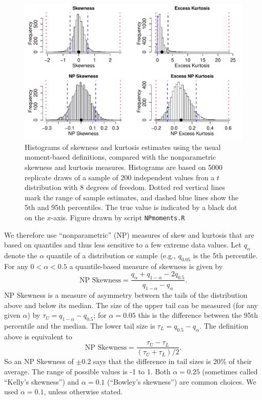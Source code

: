 \documentclass[11pt]{article}
\newcounter{box}
\newcommand{\be}{\begin{equation}}
\newcommand{\ee}{\end{equation}}
\begin{document}
{\begin{figure}[tbp]
\centering
\includegraphics[width=\textwidth]{figures/NPmoments.pdf}
\caption{Histograms of skewness and kurtosis estimates using the usual moment-based definitions, compared with the nonparametric
skewness and kurtosis measures. Histograms are based on 5000 replicate draws of a sample of 200 independent values fron 
a $t$ distribution with 8 degrees of freedom. Dotted red vertical lines mark the range of sample estimates, 
and dashed blue lines show the 5th and 95th percentiles. The true value is indicated by a black dot on the $x$-axis.
Figure drawn by script \texttt{NPmoments.R}}
\label{fig:NPmoments}
\end{figure} 

We therefore use ``nonparametric'' (NP) measures of skew and kurtosis that are based on quantiles and thus  
less sensitive to a few extreme data values. Let $q_\alpha$ denote the $\alpha$ quantile of a distribution or sample (e.g., $q_{0.05}$ 
is the 5th percentile. For any $0 < \alpha < 0.5$ a quantile-based measure of skewness is given by \citep{mcgillivray-1986}
\be
\mbox{NP Skewness} = \frac{q_\alpha + q_{1-\alpha} - 2 q_{0.5}}{q_{1-\alpha} - q_\alpha}.
\ee
NP Skewness is a measure of asymmetry between the tails of the distribution above and below its median. The size of the upper
tail can be measured (for any given $\alpha$) by $\tau_U = q_{1-\alpha} - q_{0.5}$; for $\alpha=0.05$ this is the difference
between the 95th percentile and the median. The lower tail size is $\tau_L = q_{0.5} - q_\alpha$. The definition above
is equivalent to  
\be
\mbox{NP Skewness} = \frac{\tau_U - \tau_L}{(\tau_U + \tau_L)/2}.
\label{eqn:NPskew}
\ee
So an NP Skewness of $\pm 0.2$ says that the difference in tail sizes is 20\% of their average. The range of possible values 
is -1 to 1. Both $\alpha=0.25$ (sometimes called ``Kelly's skewness'') and $\alpha=0.1$ (``Bowley's skewness'') 
are common choices. We used $\alpha=0.1$, unless otherwise stated.  
 
}
\end{document}
